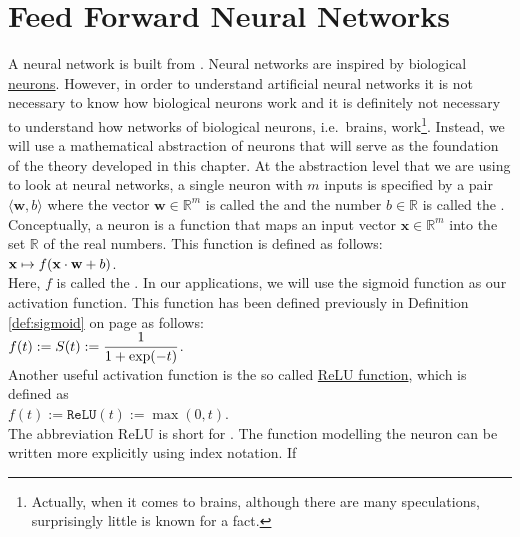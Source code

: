 \section{Feed Forward Neural Networks}
A neural network is built from .  Neural networks are inspired by biological 
\href{https://en.wikipedia.org/wiki/Neuron}{neurons}.  However, in order to understand artificial neural
networks it is not necessary to know how biological neurons work and it is definitely not necessary to
understand how networks of biological neurons, i.e.~brains, work\footnote{
  Actually, when it comes to brains, although there are many speculations, surprisingly little is known for a fact.  
}.  
Instead, we will use a mathematical abstraction of neurons that will serve as the foundation of the theory
developed in this chapter.  At the abstraction level that we are using to look at neural networks, a single neuron
with $m$ inputs is specified by a pair $\langle \mathbf{w}, b\rangle$ where the vector $\mathbf{w} \in \mathbb{R}^m$ is called the  and 
the number $b \in \mathbb{R}$ is called the .   
Conceptually, a neuron is a function that maps an input vector $\mathbf{x} \in \mathbb{R}^m$ into the set
$\mathbb{R}$ of the real numbers.  This function is defined as follows: 
\\[0.2cm]
\hspace*{1.3cm}
$\displaystyle \mathbf{x} \mapsto f(\mathbf{x} \cdot \mathbf{w} + b)$.
\\[0.2cm]
Here, $f$ is called the .   In our applications, we will
use the sigmoid function as our activation function.  This function has been defined previously in Definition
\ref{def:sigmoid} on page \pageref{def:sigmoid} as follows:
\\[0.2cm]
\hspace*{1.3cm}
$\displaystyle f(t) := S(t) := \frac{1}{1 + \exp(-t)}$.
\\[0.2cm]
Another useful activation function is the so called
\href{https://en.wikipedia.org/wiki/Rectifier_(neural_networks)}{ReLU function}, 
which is defined as 
\\[0.2cm]
\hspace*{1.3cm}
$f(t) := \mathtt{ReLU}(t) := \max(0, t)$.
\\[0.2cm]
The abbreviation ReLU is short for . 
The function modelling the neuron can be written more explicitly using index notation.  If
\\[0.2cm]
